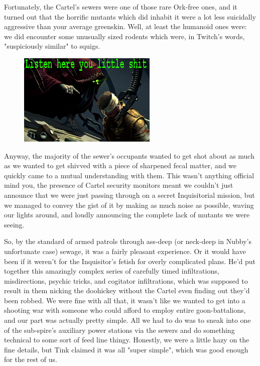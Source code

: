 Fortunately, the Cartel's sewers were one of those rare Ork-free ones, and it turned out that the horrific mutants which did inhabit it were a lot less suicidally aggressive than your average greenskin. 
Well, at least the humanoid ones were: 
we did encounter some unusually sized rodents which were, in Twitch's words, "suspiciously similar" to squigs. 


\begin{figure}
	\begin{center}
		\includegraphics[width=\figwidth]{pics/18/5.png}
	\end{center}
\end{figure}
Anyway, the majority of the sewer's occupants wanted to get shot about as much as we wanted to get shivved with a piece of sharpened fecal matter, and we quickly came to a mutual understanding with them. 
This wasn't anything official mind you, the presence of Cartel security monitors meant we couldn't just announce that we were just passing through on a secret Inquisitorial mission, but we managed to convey the gist of it by making as much noise as possible, waving our lights around, and loudly announcing the complete lack of mutants we were seeing. 


So, by the standard of armed patrols through ass-deep (or neck-deep in Nubby's unfortunate case) sewage, it was a fairly pleasant experience. 
Or it would have been if it weren't for the Inquisitor's fetish for overly complicated plans. 
He'd put together this amazingly complex series of carefully timed infiltrations, misdirections, psychic tricks, and cogitator infiltrations, which was supposed to result in them nicking the doohickey without the Cartel even finding out they'd been robbed. 
We were fine with all that, it wasn't like we wanted to get into a shooting war with someone who could afford to employ entire goon-battalions, and our part was actually pretty simple. 
All we had to do was to sneak into one of the sub-spire's auxiliary power stations via the sewers and do something technical to some sort of feed line thingy. 
Honestly, we were a little hazy on the fine details, but Tink claimed it was all "super simple", which was good enough for the rest of us.

